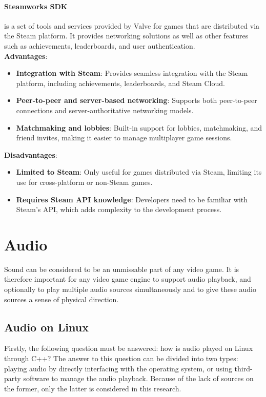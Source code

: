 \documentclass{article} %
\begin{document}
\paragraph{Steamworks SDK} is a set of tools and services provided by Valve for games that are distributed via the Steam platform. It provides networking solutions as well as other features such as achievements, leaderboards, and user authentication.
\\
\textbf{Advantages}:
\begin{itemize}
    \item \textbf{Integration with Steam}: Provides seamless integration with the Steam platform, including achievements, leaderboards, and Steam Cloud.
    \item \textbf{Peer-to-peer and server-based networking}: Supports both peer-to-peer connections and server-authoritative networking models.
    \item \textbf{Matchmaking and lobbies}: Built-in support for lobbies, matchmaking, and friend invites, making it easier to manage multiplayer game sessions.
\end{itemize}

\textbf{Disadvantages}:
\begin{itemize}
    \item \textbf{Limited to Steam}: Only useful for games distributed via Steam, limiting its use for cross-platform or non-Steam games.
    \item \textbf{Requires Steam API knowledge}: Developers need to be familiar with Steam's API, which adds complexity to the development process.
\end{itemize}

\newpage

\section{Audio}
Sound can be considered to be an unmissable part of any video game. It is therefore important for any video game engine to 
support audio playback, and optionally to play multiple audio sources simultaneously and to give these audio sources a sense of physical direction.
\subsection{Audio on Linux}
Firstly, the following question must be answered: how is audio played on Linux through C++? The answer to this question can be divided into two types:
playing audio by directly interfacing with the operating system, or using third-party software to manage the audio playback.
Because of the lack of sources on the former, only the latter is considered in this research.
\end{document}
